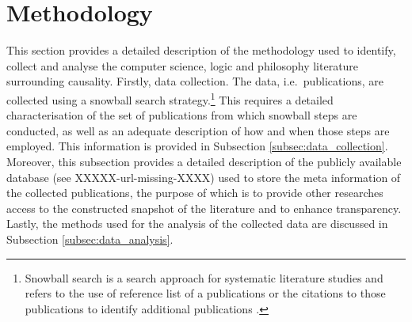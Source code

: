 \documentclass[11pt,a4paper]{book}
\theoremstyle{definition}
\theoremstyle{definition}
\theoremstyle{definition}
\theoremstyle{remark}
\begin{document}
\section{Methodology}
\label{sec:methodology}
This section provides a detailed description of the methodology used to identify, collect and analyse the computer science, logic and philosophy literature surrounding causality. Firstly, data collection. The data, i.e.\ publications, are collected using a snowball search strategy.\footnote{Snowball search is a search approach for systematic literature studies and refers to the use of reference list of a publications or the citations to those publications to identify additional publications \parencite{wohlin2014guidelines}.} This requires a detailed characterisation of the set of publications from which snowball steps are conducted, as well as an adequate description of how and when those steps are employed. This information is provided in Subsection \ref{subsec:data_collection}. 
Moreover, this subsection provides a detailed description of the publicly available database (see XXXXX-url-missing-XXXX) used to store the meta information of the collected publications, the purpose of which is to provide other researches access to the constructed snapshot of the literature and to enhance transparency. Lastly, the methods used for the analysis of the collected data are discussed in Subsection \ref{subsec:data_analysis}. 
\end{document}
